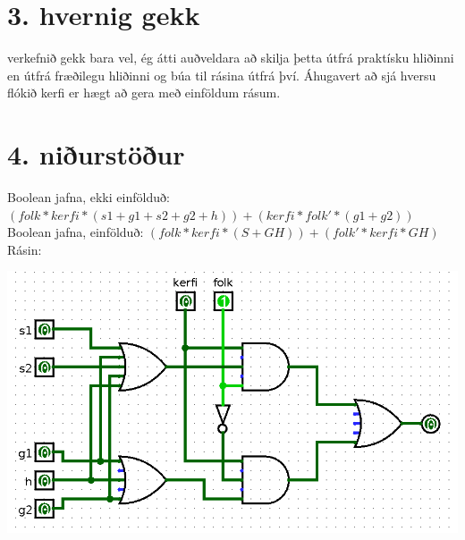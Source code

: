\documentclass{article}
\begin{document}
\section*{3. hvernig gekk}
verkefnið gekk bara vel, 
ég átti auðveldara að skilja þetta útfrá praktísku hliðinni en útfrá fræðilegu hliðinni og búa til rásina útfrá því.
Áhugavert að sjá hversu flókið kerfi er hægt að gera með einföldum rásum.

\section*{4. niðurstöður}
Boolean jafna, ekki einfölduð: $(folk*kerfi*(s1 + g1 + s2 + g2 + h)) + (kerfi*folk'*(g1 + g2))$\\
Boolean jafna, einfölduð: $(folk*kerfi*(S+GH)) + (folk'*kerfi*GH)$\\
Rásin:
\begin{center}
    \includegraphics[scale=0.25]{ras.png}
\end{center}
\end{document}
